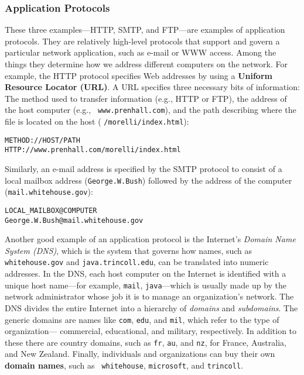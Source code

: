\subsubsection*{Application Protocols}
\noindent These three examples---HTTP, SMTP, and FTP---are examples of
application protocols.  They are relatively high-level protocols that
support and govern a particular network application, such as e-mail or
WWW access.  Among the things they determine how we address
different computers on the network.  For example, the HTTP protocol
specifies Web addresses by using a {\bf Uniform Resource Locator
(URL)}. A URL specifies three
necessary bits of information: The method used to transfer information
(e.g., HTTP or FTP), the address of the host computer (e.g., {\tt
www.prenhall.com}), and the path describing where the file is located
on the host ( {\tt /morelli/index.html}):

\begin{jjjlisting}
\begin{lstlisting}[commentstyle=\color{black}]
METHOD://HOST/PATH
HTTP://www.prenhall.com/morelli/index.html
\end{lstlisting}
\end{jjjlisting}

\noindent Similarly, an e-mail address is specified by the SMTP protocol
to consist of a local mailbox address ({\tt George.W.Bush}) followed by
the address of the computer ({\tt mail.whitehouse.gov}):

\begin{jjjlisting}
\begin{lstlisting}
LOCAL_MAILBOX@COMPUTER
George.W.Bush@mail.whitehouse.gov
\end{lstlisting}
\end{jjjlisting}

\noindent Another good example of an application protocol is the Internet's
{\it Domain Name System (DNS)}, which is the system that governs how
names, such as {\tt whitehouse.gov} and {\tt java.trincoll.edu}, can
be translated into numeric addresses.  In the DNS, each host computer
on the Internet is identified with a unique host name---for example,
{\tt mail}, {\tt java}---which is usually made up by the network
administrator whose job it is to manage an organization's network.
The DNS divides the entire Internet into a hierarchy of {\it domains}
and {\it subdomains}. The generic domains are names like {\tt com},
{\tt edu}, and {\tt mil}, which refer to the type of organization---
commercial, educational, and military, respectively.  In addition to
these there are country domains, such as {\tt fr}, {\tt au}, and {\tt nz},
for France, Australia, and New Zealand.  Finally, individuals and
organizations can buy their own {\bf domain names}, such as {\tt
whitehouse}, {\tt microsoft}, and {\tt trincoll}.


